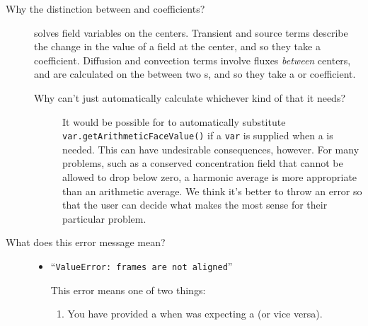 \begin{description}
\begin{description}
\begin{quote}
            \end{quote}

        \end{description}
        
    \item[Why the distinction between \Class{CellVariable} and
    \Class{FaceVariable} coefficients?]  \FiPy{} solves field
    variables on the  centers.  Transient and source terms
    describe the change in the value of a field at the 
    center, and so they take a  coefficient.
    Diffusion and convection terms involve fluxes \emph{between}
     centers, and are calculated on the 
    between two s, and so they take a 
    or  coefficient.
    
        \begin{description}
            \item [Why can't \FiPy{} just automatically calculate
            whichever kind of  that it needs?]  It
            would be possible for \FiPy{} to automatically substitute
            \verb+var.getArithmeticFaceValue()+ if a
             \verb+var+ is supplied when a
             is needed.  This can have undesirable
            consequences, however.  For many problems, such as a
            conserved concentration field that cannot be allowed to
            drop below zero, a harmonic average is more appropriate
            than an arithmetic average.  We think it's better to throw
            an error so that the \FiPy{} user can decide what makes
            the most sense for their particular problem.
        \end{description}
        
    \item[What does this error message mean?]\hspace*{\fill}
    
        \begin{itemize}
            
            \item ``\texttt{ValueError: frames are not aligned}''
            
            This error means one of two things:
            
            \begin{enumerate}
                
                \item You have provided a  when 
                \FiPy{} was expecting a  (or vice 
                versa).
                

\end{enumerate}
\end{itemize}
\end{description}
